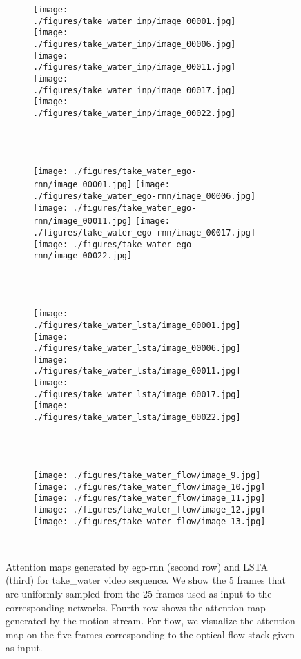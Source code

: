 \documentclass[10pt,twocolumn,letterpaper]{article}
\begin{document}
	
\begin{figure*}[t]
	\centering      
	\begin{subfigure}[b]{0.95\textwidth}
		\texttt{[image: ./figures/take\_water\_inp/image\_00001.jpg]}
		\texttt{[image: ./figures/take\_water\_inp/image\_00006.jpg]}
		\texttt{[image: ./figures/take\_water\_inp/image\_00011.jpg]}
		\texttt{[image: ./figures/take\_water\_inp/image\_00017.jpg]}
		\texttt{[image: ./figures/take\_water\_inp/image\_00022.jpg]}
	\end{subfigure}\\ \vskip 2mm
	\ 
	\begin{subfigure}[b]{0.95\textwidth}
		\texttt{[image: ./figures/take\_water\_ego-rnn/image\_00001.jpg]}
		\texttt{[image: ./figures/take\_water\_ego-rnn/image\_00006.jpg]}
		\texttt{[image: ./figures/take\_water\_ego-rnn/image\_00011.jpg]}
		\texttt{[image: ./figures/take\_water\_ego-rnn/image\_00017.jpg]}
		\texttt{[image: ./figures/take\_water\_ego-rnn/image\_00022.jpg]}
	\end{subfigure}\\ \vskip 2mm
	\ 
	\begin{subfigure}[b]{0.95\textwidth}
		\texttt{[image: ./figures/take\_water\_lsta/image\_00001.jpg]}
		\texttt{[image: ./figures/take\_water\_lsta/image\_00006.jpg]}
		\texttt{[image: ./figures/take\_water\_lsta/image\_00011.jpg]}
		\texttt{[image: ./figures/take\_water\_lsta/image\_00017.jpg]}
		\texttt{[image: ./figures/take\_water\_lsta/image\_00022.jpg]}
	\end{subfigure}\\ \vskip 2mm	       
	\ 
	\begin{subfigure}[b]{0.95\textwidth}
		\texttt{[image: ./figures/take\_water\_flow/image\_9.jpg]}
		\texttt{[image: ./figures/take\_water\_flow/image\_10.jpg]}
		\texttt{[image: ./figures/take\_water\_flow/image\_11.jpg]}
		\texttt{[image: ./figures/take\_water\_flow/image\_12.jpg]}
		\texttt{[image: ./figures/take\_water\_flow/image\_13.jpg]}
	\end{subfigure}\\ \vskip 2mm			 
	\caption{Attention maps generated by ego-rnn (second row) and LSTA (third) for take\_water video sequence. We show the 5 frames that are uniformly sampled from the 25 frames used as input to the corresponding networks. Fourth row shows the attention map generated by the motion stream. For flow, we visualize the attention map on the five frames corresponding to the optical flow stack given as input.}
	\label{fig:att_map_take_water}
\end{figure*}
	
\end{document}
